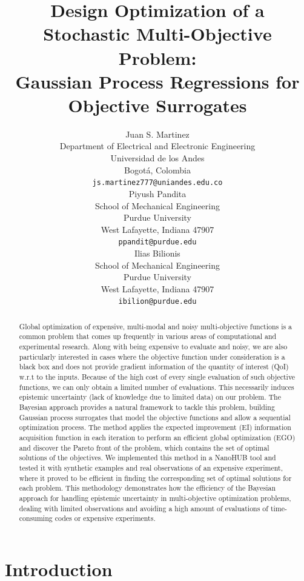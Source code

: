 \documentclass{article}
\title{Design Optimization of a Stochastic Multi-Objective Problem: \\Gaussian Process Regressions for Objective Surrogates}
\author{
  Juan S. Martinez\\
  Department of Electrical and Electronic Engineering\\
  Universidad de los Andes\\
  Bogotá, Colombia \\
  \texttt{js.martinez777@uniandes.edu.co} \\
  \And
  Piyush Pandita \\
  School of Mechanical Engineering \\
  Purdue University \\
  West Lafayette, Indiana 47907\\
  \texttt{ppandit@purdue.edu} \\
  \AND
  Ilias Bilionis \\
  School of Mechanical Engineering \\
  Purdue University \\
  West Lafayette, Indiana 47907\\
  \texttt{ibilion@purdue.edu} \\
}
\begin{document}

\maketitle

\begin{abstract}
    Global optimization of expensive, multi-modal and noisy multi-objective functions is a common problem that comes up frequently in various areas of computational and experimental research. Along with being expensive to evaluate and noisy, we are also particularly interested in cases where the objective function under consideration is a black box and does not provide gradient information of the quantity of interest (QoI) w.r.t to the inputs. Because of the high cost of every single evaluation of such objective functions, we can only obtain a limited number of evaluations. This necessarily induces epistemic uncertainty (lack of knowledge due to limited data) on our problem. The Bayesian approach provides a natural framework to tackle this problem, building Gaussian process surrogates that model the objective functions and allow a sequential optimization process. The method applies the expected improvement (EI) information acquisition function in each iteration to perform an efficient global optimization (EGO) and discover the Pareto front of the problem, which contains the set of optimal solutions of the objectives. We implemented this method in a NanoHUB tool and tested it with synthetic examples and real observations of an expensive experiment, where it proved to be efficient in finding the corresponding set of optimal solutions for each problem. This methodology demonstrates how the efficiency of the Bayesian approach for handling epistemic uncertainty in multi-objective optimization problems, dealing with limited observations and avoiding a high amount of evaluations of time-consuming codes or expensive experiments.
\end{abstract}

\section{Introduction}
\end{document}
